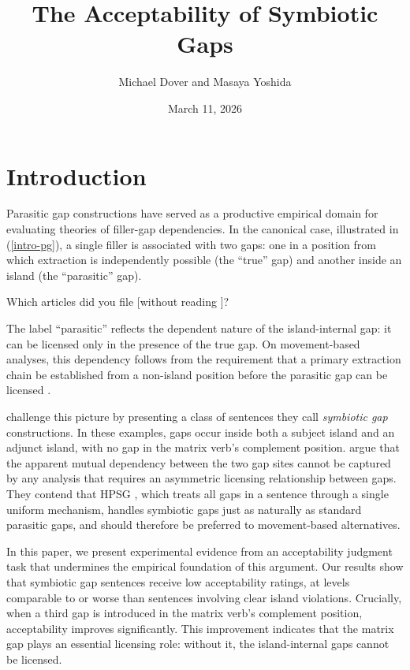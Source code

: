 \documentclass[12pt]{article}
\title{The Acceptability of Symbiotic Gaps}
\author{Michael Dover and Masaya Yoshida}
\date{March 11, 2026}
\begin{document}
\maketitle


\section{Introduction}

Parasitic gap constructions \citep{ross1967,engdahl1983,culicover2001} have served as a productive empirical domain for evaluating theories of filler-gap dependencies. In the canonical case, illustrated in (\ref{intro-pg}), a single filler is associated with two gaps: one in a position from which extraction is independently possible (the ``true'' gap) and another inside an island (the ``parasitic'' gap).

\ex\label{intro-pg} Which articles did you file \underline{\hspace{1em}} [without reading \underline{\hspace{1em}}]?
\xe

\noindent The label ``parasitic'' reflects the dependent nature of the island-internal gap: it can be licensed only in the presence of the true gap. On movement-based analyses, this dependency follows from the requirement that a primary extraction chain be established from a non-island position before the parasitic gap can be licensed \citep[see, e.g.,][]{chomsky1982,chomsky1986,kayne1983,nunes2004}.

\citet{levine2003} challenge this picture by presenting a class of sentences they call \emph{symbiotic gap} constructions. In these examples, gaps occur inside both a subject island and an adjunct island, with no gap in the matrix verb's complement position. \citeauthor{levine2003} argue that the apparent mutual dependency between the two gap sites cannot be captured by any analysis that requires an asymmetric licensing relationship between gaps. They contend that HPSG \citep{pollard1994}, which treats all gaps in a sentence through a single uniform mechanism, handles symbiotic gaps just as naturally as standard parasitic gaps, and should therefore be preferred to movement-based alternatives.

In this paper, we present experimental evidence from an acceptability judgment task that undermines the empirical foundation of this argument. Our results show that symbiotic gap sentences receive low acceptability ratings, at levels comparable to or worse than sentences involving clear island violations. Crucially, when a third gap is introduced in the matrix verb's complement position, acceptability improves significantly. This improvement indicates that the matrix gap plays an essential licensing role: without it, the island-internal gaps cannot be licensed.
\end{document}

